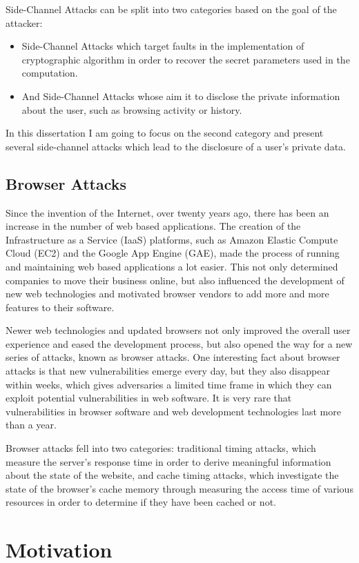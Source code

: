 \documentclass[10pt,a4paper,twoside]{book}
\begin{document}
Side-Channel Attacks can be split into two categories based on the goal of the attacker:
\begin{itemize}
\item Side-Channel Attacks which target faults in the implementation of cryptographic algorithm in order to recover the secret parameters used in the computation. 
\item And Side-Channel Attacks whose aim it to disclose the private information about the user, such as browsing activity or history.
\end{itemize}
In this dissertation I am going to focus on the second category and present several side-channel attacks which lead to the disclosure of a user's private data.

\subsection{Browser Attacks}
Since the invention of the Internet, over twenty years ago, there has been an increase in the number of web based applications. The creation of the Infrastructure as a Service (IaaS) platforms, such as Amazon Elastic Compute Cloud (EC2) and the Google App Engine (GAE), made the process of running and maintaining web based applications a lot easier. This not only determined companies to move their business online, but also influenced the development of new web technologies and motivated browser vendors to add more and more features to their software. 

Newer web technologies and updated browsers not only improved the overall user experience and eased the development process, but also opened the way for a new series of attacks, known as browser attacks. One interesting fact about browser attacks is that new vulnerabilities emerge every day, but they also disappear within weeks, which gives adversaries a limited time frame in which they can exploit potential vulnerabilities in web software. It is very rare that vulnerabilities in browser software and web development technologies last more than a year.

Browser attacks fell into two categories: traditional timing attacks, which measure the server's response time in order to derive meaningful information about the state of the website, and cache timing attacks, which investigate the state of the browser's cache memory through measuring the access time of various resources in order to determine if they have been cached or not.

\section{Motivation}
\end{document}
